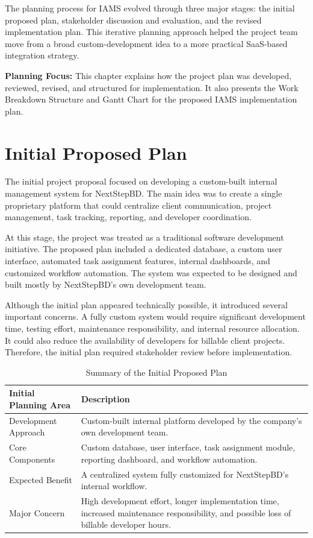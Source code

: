 \documentclass[12pt,a4paper]{report}
\begin{document}
The planning process for IAMS evolved through three major stages: the initial proposed plan, stakeholder discussion and evaluation, and the revised implementation plan. This iterative planning approach helped the project team move from a broad custom-development idea to a more practical SaaS-based integration strategy.

\begin{highlightBox}
\textbf{Planning Focus:} This chapter explains how the project plan was developed, reviewed, revised, and structured for implementation. It also presents the Work Breakdown Structure and Gantt Chart for the proposed IAMS implementation plan.
\end{highlightBox}

\section{Initial Proposed Plan}

The initial project proposal focused on developing a custom-built internal management system for NextStepBD. The main idea was to create a single proprietary platform that could centralize client communication, project management, task tracking, reporting, and developer coordination.

At this stage, the project was treated as a traditional software development initiative. The proposed plan included a dedicated database, a custom user interface, automated task assignment features, internal dashboards, and customized workflow automation. The system was expected to be designed and built mostly by NextStepBD's own development team.

Although the initial plan appeared technically possible, it introduced several important concerns. A fully custom system would require significant development time, testing effort, maintenance responsibility, and internal resource allocation. It could also reduce the availability of developers for billable client projects. Therefore, the initial plan required stakeholder review before implementation.

\begin{table}[H]
\centering
\renewcommand{\arraystretch}{1.35}
\begin{tabularx}{\textwidth}{|p{4cm}|X|}
\hline
\rowcolor{secondary}
\textbf{Initial Planning Area} & \textbf{Description} \\
\hline
Development Approach & Custom-built internal platform developed by the company’s own development team. \\
\hline
Core Components & Custom database, user interface, task assignment module, reporting dashboard, and workflow automation. \\
\hline
Expected Benefit & A centralized system fully customized for NextStepBD's internal workflow. \\
\hline
Major Concern & High development effort, longer implementation time, increased maintenance responsibility, and possible loss of billable developer hours. \\
\hline
\end{tabularx}
\caption{Summary of the Initial Proposed Plan}
\end{table}
\end{document}

